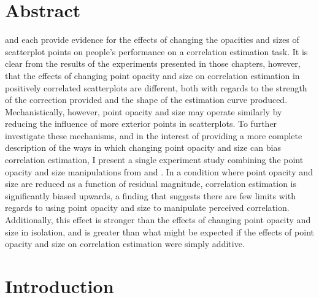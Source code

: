 \documentclass[../main.tex]{subfiles}
\begin{document}
\section{Abstract}\label{abstract-interactions}

 and  each
provide evidence for the effects of changing the opacities and sizes of
scatterplot points on people's performance on a correlation estimation
task. It is clear from the results of the experiments presented in those
chapters, however, that the effects of changing point opacity and size
on correlation estimation in positively correlated scatterplots are
different, both with regards to the strength of the correction provided
and the shape of the estimation curve produced. Mechanistically,
however, point opacity and size may operate similarly by reducing the
influence of more exterior points in scatterplots. To further
investigate these mechanisms, and in the interest of providing a more
complete description of the ways in which changing point opacity and
size can bias correlation estimation, I present a single experiment
study combining the point opacity and size manipulations from
 and . In a
condition where point opacity and size are reduced as a function of
residual magnitude, correlation estimation is significantly biased
upwards, a finding that suggests there are few limits with regards to
using point opacity and size to manipulate perceived correlation.
Additionally, this effect is stronger than the effects of changing point
opacity and size in isolation, and is greater than what might be
expected if the effects of point opacity and size on correlation
estimation were simply additive.

\section{Introduction}\label{introduction-interactions}
\end{document}
